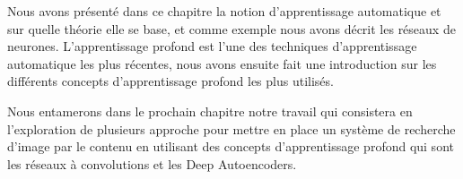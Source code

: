 	Nous avons présenté dans ce chapitre la notion d'apprentissage automatique et sur quelle théorie elle se base, et comme exemple nous avons décrit les réseaux de neurones. L'apprentissage profond est l'une des techniques d'apprentissage automatique les plus récentes, nous avons ensuite fait une introduction sur les différents concepts d'apprentissage profond les plus utilisés.
	
	Nous entamerons dans le prochain chapitre notre travail qui consistera en l'exploration de plusieurs approche pour mettre en place un système de recherche d'image par le contenu en utilisant des concepts d'apprentissage profond qui sont les réseaux à convolutions et les Deep Autoencoders.

